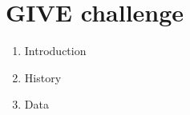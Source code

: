 \chapter{GIVE challenge}
\begin{enumerate}
\item
Introduction
\item
History
\item
Data
\end{enumerate}